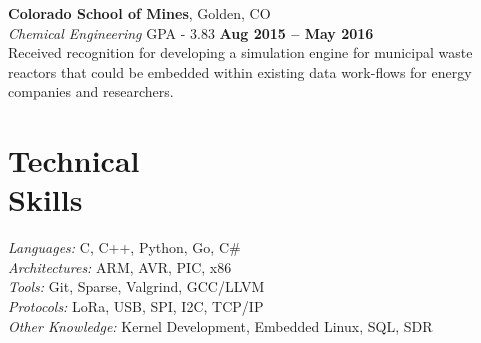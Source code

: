 \documentclass[margin,line]{resume}
\begin{document}
\begin{resume}
    \textbf{Colorado School of Mines}, Golden, CO \vspace{2mm}\\\vspace{1mm}%
    \textsl{Chemical Engineering} GPA - 3.83 \hfill \textbf{Aug 2015 -- May 2016}\\
    Received recognition for developing a simulation engine for municipal waste
    reactors that could be embedded within existing data work-flows for energy
    companies and researchers.

    \section{\mysidestyle Technical\\Skills}

    \emph{Languages:} C, C++, Python, Go, C\#\\
    \emph{Architectures:} ARM, AVR, PIC, x86\\
    \emph{Tools:} Git, Sparse, Valgrind, GCC/LLVM\\
    \emph{Protocols:} LoRa, USB, SPI, I2C, TCP/IP\\
    \emph{Other Knowledge:} Kernel Development, Embedded Linux, SQL, SDR\\
\end{resume}
\end{document}
